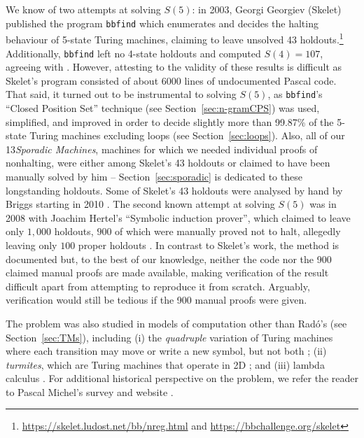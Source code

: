 \documentclass[a4paper,british]{article}
\theoremstyle{definition} %
\numberwithin{equation}{section}
\theoremstyle{definition} %
\newcommand{\rado}{Rad\'o\xspace}
\newcommand{\numSporadic}{13\xspace}
\begin{document}
We know of two attempts at solving $S(5)$: in 2003, Georgi Georgiev (Skelet) published the program \texttt{bbfind} \cite{Skelet_bbfind} which enumerates and decides the halting behaviour of 5-state Turing machines, claiming to leave unsolved 43 holdouts.\footnote{\url{https://skelet.ludost.net/bb/nreg.html} and \url{https://bbchallenge.org/skelet}} Additionally, \texttt{bbfind} left no 4-state holdouts and computed $S(4) = 107$, agreeing with \cite{Brady83}. However, attesting to the validity of these results is difficult as Skelet's program consisted of about 6000 lines of undocumented Pascal code. That said, it turned out to be instrumental to solving $S(5)$, as \texttt{bbfind}'s ``Closed Position Set'' technique (see Section~\ref{sec:n-gramCPS}) was used, simplified, and improved in order to decide slightly more than 99.87\% of the 5-state Turing machines excluding loops (see Section~\ref{sec:loops}). Also, all of our \numSporadic \textit{Sporadic Machines}, \ie machines for which we needed individual proofs of nonhalting, were either among Skelet's 43 holdouts or claimed to have been manually solved by him -- Section~\ref{sec:sporadic} is dedicated to these longstanding holdouts. Some of Skelet's 43 holdouts were analysed by hand by Briggs starting in 2010 \cite{DanBriggs}. The second known attempt at solving $S(5)$ was in 2008 with Joachim Hertel's ``Symbolic induction prover'', which claimed to leave only $1{,}000$ holdouts, $900$ of which were manually proved not to halt, allegedly leaving only $100$ proper holdouts \cite{Hertel}. In contrast to Skelet's work, the method is documented but, to the best of our knowledge, neither the code nor the 900 claimed manual proofs are made available, making verification of the result difficult apart from attempting to reproduce it from scratch. Arguably, verification would still be tedious if the 900 manual proofs were given.

The \BBfull problem was also studied in models of computation other than \rado's (see Section~\ref{sec:TMs}), including (i) the \textit{quadruple} variation of Turing machines where each transition may move or write a new symbol, but not both \cite{Ross2003,Ross2005}; (ii) \textit{turmites}, which are Turing machines that operate in 2D \cite{BradyMeaningOfLife}; and (iii) lambda calculus \cite{tromp_oeis}. For additional historical perspective on the \BBfull problem, we refer the reader to Pascal Michel's survey and website \cite{michel2019busy,PMichel_website}.
\end{document}
